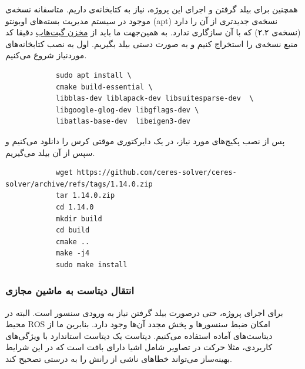 \documentclass[11pt, a4paper]{article}
\begin{document}
	همچنین برای بیلد گرفتن و اجرای این پروژه، نیاز به کتابخانه‌ی 
	 داریم. متاسفانه نسخه‌ی موجود در سیستم مدیریت بسته‌های اوبونتو 
	(apt) نسخه‌ی جدیدتری از آن را دارد 
	(نسخه‌ی ۲.۲) که   با آن سازگاری ندارد. به همین‌جهت ما باید از 
	\href{https://github.com/ceres-solver/ceres-solver/releases/tag/1.14.0}{مخزن گیت‌هاب}
	دقیقا کد منبع نسخه‌ی 
	 را استخراج کنیم و به صورت دستی بیلد بگیریم.
	اول به نصب کتابخانه‌های موردنیاز شروع می‌کنیم.
	\begin{LTR}
		\begin{verbatim}
			sudo apt install \
			cmake build-essential \
			libblas-dev liblapack-dev libsuitesparse-dev  \
			libgoogle-glog-dev libgflags-dev \
			libatlas-base-dev  libeigen3-dev
		\end{verbatim}
	\end{LTR}
	پس از نصب پکیج‌های مورد نیاز، در یک دایرکتوری موقتی کرس را دانلود می‌کنیم و سپس از آن بیلد می‌گیریم.
	\begin{LTR}
		\begin{verbatim}
			wget https://github.com/ceres-solver/ceres-solver/archive/refs/tags/1.14.0.zip
			tar 1.14.0.zip
			cd 1.14.0
			mkdir build
			cd build
			cmake ..
			make -j4
			sudo make install
		\end{verbatim}
	\end{LTR}
	
	\subsubsection{انتقال دیتاست به ماشین مجازی}
	
	
	برای اجرای پروژه، حتی درصورت بیلد گرفتن نیاز به ورودی سنسور است. البته در محیط 
	\gls{ROS} امکان ضبط سنسورها و پخش مجدد آن‌ها وجود دارد. بنابرین ما از دیتاست‌های آماده استفاده می‌کنیم. دیتاست 
	\href{https://projects.asl.ethz.ch/datasets/doku.php?id=kmavvisualinertialdatasets}{} یک دیتاست استاندارد با ویژگی‌های کاربردی، مثلا  حرکت در تصاویر  شامل اشیا دارای بافت است که در این شرایط بهینه‌ساز می‌تواند خطاهای ناشی از رانش را به درستی تصحیح کند.
	
\end{document}
